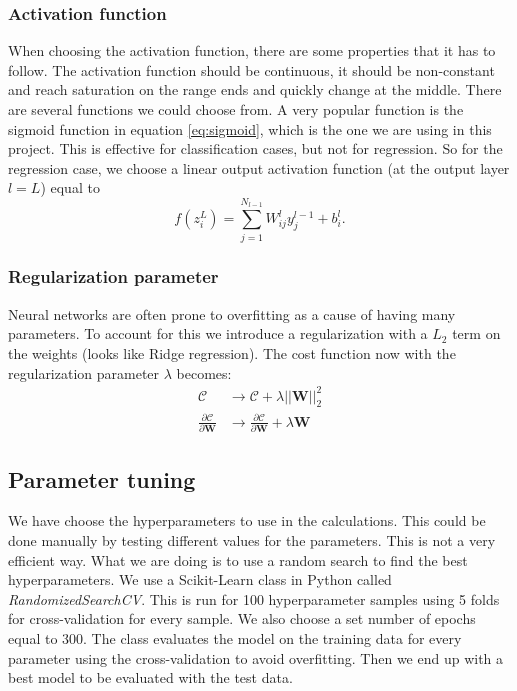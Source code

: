 \documentclass[12pt,a4paper,english]{article}
\begin{document}
\subsubsection{Activation function}
\label{subsect:activ_func}
When choosing the activation function, there are some properties that it has to follow. The activation function should be continuous, it should be non-constant and reach saturation on the range ends and quickly change at the middle. There are several functions we could choose from. A very popular function is the sigmoid function in equation \ref{eq:sigmoid}, which is the one we are using in this project. This is effective for classification cases, but not for regression. So for the regression case, we choose a linear output activation function (at the output layer $l=L$) equal to \[f(z^L_i)=\sum_{j=1}^{N_{l-1}}W_{ij}^ly_j^{l-1}+b_i^l.\]  

\subsubsection{Regularization parameter}
\label{subsect:regular_param}
Neural networks are often prone to overfitting as a cause of having many parameters. To account for this we introduce a regularization with a $L_2$ term on the weights (looks like Ridge regression). The cost function now with the regularization parameter $\lambda$ becomes:
\begin{align*}
\mathcal{C}&\rightarrow\mathcal{C}+\lambda||\textbf{W}||^2_2\\
\frac{\partial \mathcal{C}}{\partial \textbf{W}}&\rightarrow \frac{\partial \mathcal{C}}{\partial \textbf{W}}+\lambda\textbf{W}
\end{align*}

\subsection{Parameter tuning}
\label{subsect:tuning}
We have choose the hyperparameters to use in the calculations. This could be done manually by testing different values for the parameters. This is not a very efficient way. What we are doing is to use a random search to find the best hyperparameters. We use a Scikit-Learn class in Python called \textit{RandomizedSearchCV}. This is run for 100 hyperparameter samples using 5 folds for cross-validation for every sample. We also choose a set number of epochs equal to 300. The class evaluates the model on the training data for every parameter using the cross-validation to avoid overfitting. Then we end up with a best model to be evaluated with the test data.
\end{document}
